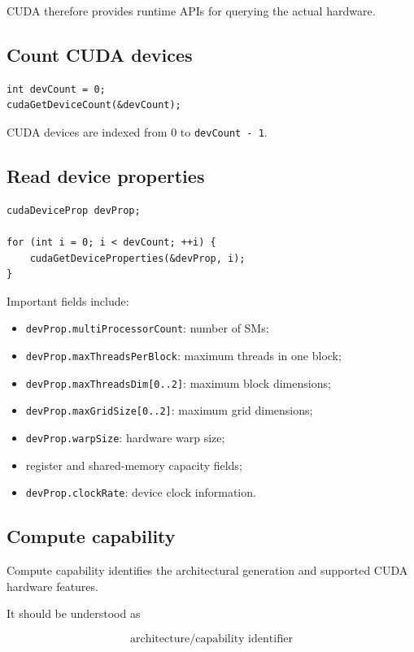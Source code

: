 \documentclass[11pt,a4paper]{article}
\begin{document}
CUDA therefore provides runtime APIs for querying the actual hardware.

\subsection{Count CUDA devices}

\begin{lstlisting}
int devCount = 0;
cudaGetDeviceCount(&devCount);
\end{lstlisting}

CUDA devices are indexed from 0 to \texttt{devCount - 1}.

\subsection{Read device properties}

\begin{lstlisting}
cudaDeviceProp devProp;

for (int i = 0; i < devCount; ++i) {
    cudaGetDeviceProperties(&devProp, i);
}
\end{lstlisting}

Important fields include:

\begin{itemize}
    \item \texttt{devProp.multiProcessorCount}: number of SMs;
    \item \texttt{devProp.maxThreadsPerBlock}: maximum threads in one block;
    \item \texttt{devProp.maxThreadsDim[0..2]}: maximum block dimensions;
    \item \texttt{devProp.maxGridSize[0..2]}: maximum grid dimensions;
    \item \texttt{devProp.warpSize}: hardware warp size;
    \item register and shared-memory capacity fields;
    \item \texttt{devProp.clockRate}: device clock information.
\end{itemize}

\subsection{Compute capability}

Compute capability identifies the architectural generation and supported CUDA hardware features.

It should be understood as

\[
\boxed{
\text{architecture/capability identifier}
}
\]
\end{document}
